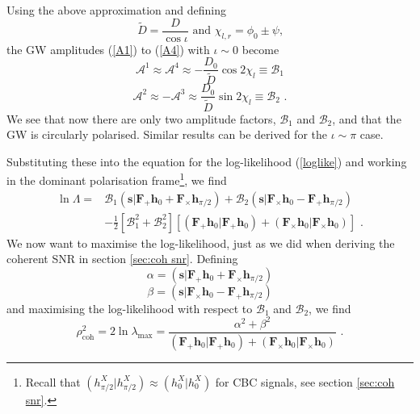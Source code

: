\documentclass[11pt]{cuthesis}
\newcommand{\fs}{\text{ .}}
\begin{document}
Using the above approximation and defining 
\begin{equation}
\tilde{D} = \frac{D}{\cos\iota} \text{   and   } \chi_{l,r} = \phi_0 \pm \psi \text{,} 
\end{equation}
the GW amplitudes  (\ref{A1}) to (\ref{A4}) with $\iota\sim 0$ become
\begin{equation}
\mathcal{A}^1 \approx \mathcal{A}^4 \approx -\frac{D_0}{\tilde{D}} \cos 2\chi_l \equiv \mathcal{B}_1
\end{equation}
\begin{equation}
\mathcal{A}^2 \approx -\mathcal{A}^3 \approx \frac{D_0}{\tilde{D}} \sin 2\chi_l \equiv \mathcal{B}_2 \fs
\end{equation}
We see that now there are only two amplitude factors, $\mathcal{B}_1$ and $\mathcal{B}_2$, and that the GW is circularly polarised. Similar results can be derived for the $\iota \sim \pi$ case. 

Substituting these into the equation for the log-likelihood (\ref{loglike}) and working in the dominant polarisation frame\footnote{Recall that $(h_{\pi/2}^X|h_{\pi/2}^X)\approx (h_0^X|h_0^X)$ for CBC signals, see section \ref{sec:coh snr}.}, we find
\begin{align} 
\ln \Lambda = & \mathcal{B}_1 (\textbf{s}|\textbf{F}_+\textbf{h}_0 + \textbf{F}_\times \textbf{h}_{\pi /2} ) + \mathcal{B}_2  (\textbf{s}|\textbf{F}_\times\textbf{h}_0 - \textbf{F}_+ \textbf{h}_{\pi /2} ) \\ & - \frac{1}{2} [\mathcal{B}_1^2 + \mathcal{B}_2^2 ] [ (\textbf{F}_+\textbf{h}_0|\textbf{F}_+\textbf{h}_0) + (\textbf{F}_\times \textbf{h}_0|\textbf{F}_\times \textbf{h}_0) ] \fs
\end{align}
We now want to maximise the log-likelihood, just as we did when deriving the coherent SNR in section \ref{sec:coh snr}.  Defining 
\begin{equation}
\alpha = (\textbf{s}|\textbf{F}_+\textbf{h}_0 + \textbf{F}_\times \textbf{h}_{\pi /2} )
\end{equation}
\begin{equation}
\beta =  (\textbf{s}|\textbf{F}_\times\textbf{h}_0 - \textbf{F}_+ \textbf{h}_{\pi /2} ) 
\end{equation}
and maximising the log-likelihood with respect to $\mathcal{B}_1$ and $\mathcal{B}_2$, we find 
\begin{equation}
\rho_\text{coh}^2 = 2\ln \lambda_\text{max} = \frac{\alpha^2 + \beta^2}{ (\textbf{F}_+\textbf{h}_0|\textbf{F}_+\textbf{h}_0) + (\textbf{F}_\times \textbf{h}_0|\textbf{F}_\times \textbf{h}_0)} \fs
\end{equation}
\end{document}
